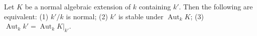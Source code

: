 Let $K$ be a normal algebraic extension of $k$ containing $k'$. Then the following are equivalent: (1) $k'/k$ is normal; (2) $k'$ is stable under $\operatorname{Aut}_k K$; (3) $\operatorname{Aut}_k k' = \operatorname{Aut}_k K|_{k'}$.
